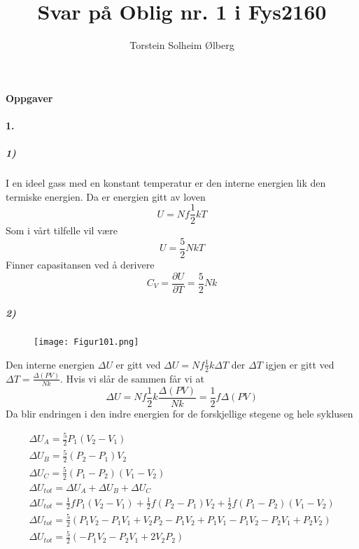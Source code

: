 \documentclass[11pt, A4paper,norsk]{article}
\author{Torstein Solheim Ølberg}
\title{Svar på Oblig nr. 1 i Fys2160}
\begin{document}
\maketitle
	\begin{center}
\Large \textbf{Oppgaver}
	\end{center}









		\paragraph{1.}
			\subparagraph{1)}
				\begin{flushleft}
I en ideel gass med en konstant temperatur er den interne energien lik den termiske energien. Da er energien gitt av loven
$$U = Nf\frac{1}{2}kT$$
Som i vårt tilfelle vil være
$$U = \frac{5}{2}NkT$$
Finner capasitansen ved å derivere
$$C_V = \frac{\partial U}{\partial T} = \frac{5}{2}Nk$$
				\end{flushleft}









			\subparagraph{2)}
				\begin{figure}[H]
\texttt{[image: Figur101.png]}
				\end{figure}
				\begin{flushleft}
Den interne energien $\Delta U$ er gitt ved $\Delta U = N f \frac{1}{2} k \Delta T$ der $\Delta T$ igjen er gitt ved $\Delta T = \frac{\Delta (PV)}{Nk}$. Hvis vi slår de sammen får vi at
$$\Delta U = N f \frac{1}{2} k \frac{\Delta (PV)}{Nk} = \frac{1}{2} f \Delta (PV)$$
Da blir endringen i den indre energien for de forskjellige stegene og hele syklusen
				\end{flushleft}
				\begin{gather*}
\Delta U_A = \frac{5}{2} P_1 (V_2 - V_1) \\
\Delta U_B = \frac{5}{2} (P_2 - P_1) V_2 \\
\Delta U_C = \frac{5}{2} (P_1 - P_2) (V_1 - V_2) \\
\Delta U_{tot} = \Delta U_A + \Delta U_B + \Delta U_C \\
\Delta U_{tot} = \frac{1}{2} f P_1 (V_2 - V_1) + \frac{1}{2} f (P_2 - P_1) V_2 + \frac{1}{2} f (P_1 - P_2) (V_1 - V_2) \\
\Delta U_{tot} = \frac{5}{2} \left( P_1 V_2 - P_1 V_1 + V_2 P_2 - P_1 V_2 + P_1 V_1 - P_1 V_2 - P_2 V_1 + P_2 V_2 \right) \\
\Delta U_{tot} = \frac{5}{2} \left( - P_1 V_2 - P_2 V_1 + 2 V_2 P_2 \right) \\
				\end{gather*}
\end{document}
